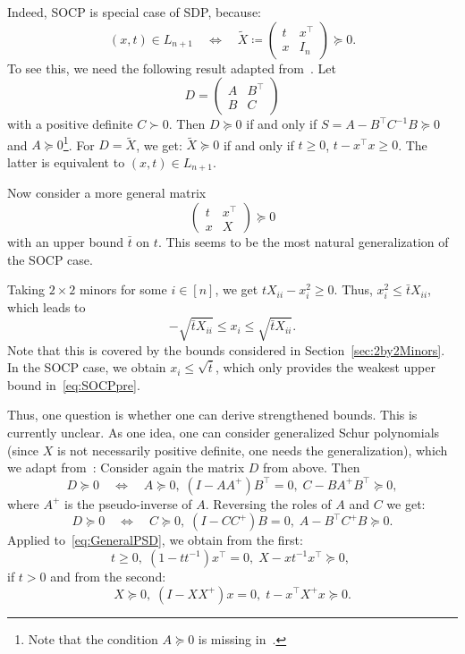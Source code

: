 \documentclass[10pt, a4paper]{article}
\newcommand{\define}{\coloneqq}
\newcommand{\T}{^{\top}}
\begin{document}
Indeed, SOCP is special case of SDP, because:
\[
  (x,t) \in L_{n+1} \quad\Leftrightarrow\quad
  \tilde{X} \define
  \begin{pmatrix}
    t & x\T\\
    x & I_n
  \end{pmatrix}
  \succeq 0.
\]
To see this, we need the following result adapted
from~\cite[Section~A.5.5]{BoyV09}. Let
\[
  D = \begin{pmatrix}
    A & B\T\\
    B & C
  \end{pmatrix}
\]
with a positive definite $C \succ 0$. Then $D \succeq 0$ if and only if
$S = A - B\T C^{-1} B \succeq 0$ and $A \succeq 0$\footnote{Note that the
  condition $A \succeq 0$ is missing in~\cite{BoyV09}.}. For $D = \tilde{X}$, we
get: $\tilde{X} \succeq 0$ if and only if $t \geq 0$, $t - x\T x \geq
0$. The latter is equivalent to $(x,t) \in L_{n+1}$.

Now consider a more general matrix
\begin{equation}\label{eq:GeneralPSD}
  \begin{pmatrix}
    t & x\T\\
    x & X
  \end{pmatrix}
  \succeq 0
\end{equation}
with an upper bound $\bar{t}$ on $t$. This seems to be the most natural
generalization of the SOCP case.

Taking $2 \times 2$ minors for some $i \in [n]$, we get
$t X_{ii} - x_i^2 \geq 0$. Thus, $x_i^2 \leq \bar{t} X_{ii}$, which leads
to
\[
  - \sqrt{\bar{t} X_{ii}} \leq x_i \leq \sqrt{\bar{t} X_{ii}}.
\]
Note that this is covered by the bounds considered in
Section~\ref{sec:2by2Minors}. In the SOCP case, we obtain
$x_i \leq \sqrt{\bar{t}}$, which only provides the weakest upper bound
in~\eqref{eq:SOCPpre}.

Thus, one question is whether one can derive strengthened bounds. This is
currently unclear. As one idea, one can consider generalized Schur
polynomials (since $X$ is not necessarily positive definite, one needs the
generalization), which we adapt from~\cite[Section~A.5.5]{BoyV09}: Consider
again the matrix $D$ from above. Then
\[
  D \succeq 0 \quad\Leftrightarrow\quad
  A \succeq 0,\; (I - AA^{+})B\T = 0,\; C - B A^{+} B\T \succeq 0,
\]
where $A^+$ is the pseudo-inverse of $A$. Reversing the roles of $A$ and
$C$ we get:
\[
  D \succeq 0 \quad\Leftrightarrow\quad
  C \succeq 0,\; (I - CC^{+})B = 0,\; A - B\T C^{+} B \succeq 0.
\]
Applied to~\eqref{eq:GeneralPSD}, we obtain from the first:
\begin{equation}\label{eq:GenSchur1}
  t \geq 0,\; (1 - t t^{-1}) x\T = 0,\; X - x t^{-1} x\T \succeq 0,\; 
\end{equation}
if $t > 0$ and from the second:
\begin{equation}\label{eq:GenSchur2}
  X \succeq 0,\; (I - XX^{+})x = 0,\; t - x\T X^{+} x \succeq 0.
\end{equation}
\end{document}
